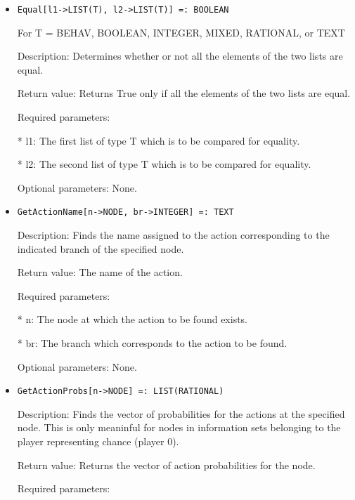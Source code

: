 \begin{itemize}
\item
\begin{verbatim}
Equal[l1->LIST(T), l2->LIST(T)] =: BOOLEAN
\end{verbatim}

	For T = BEHAV, BOOLEAN, INTEGER, MIXED, RATIONAL, or TEXT

\bd
\item
[Description:] Determines whether or not all the elements of the two
lists are equal.
\item
[Return value:] Returns True only if all the elements of the two lists
are equal.
\item
[Required parameters:]\hfil\null 
	
\bd
\item
[* l1:] The first list of type T which is to be compared for equality.
\item
[* l2:] The second list of type T which is to be compared for 
equality.
\ed

\item
[Optional parameters:] None.

\ed

\item
\begin{verbatim}
GetActionName[n->NODE, br->INTEGER] =: TEXT
\end{verbatim}

\bd
\item
[Description:] Finds the name assigned to the action corresponding to 
the indicated branch of the specified node.
\item   
[Return value:] The name of the action.
\item
[Required parameters:]\hfil\null
	
\bd
\item
[* n:] The node at which the action to be found exists.
\item
[* br:] The branch which corresponds to the action to be found.
\ed

\item
[Optional parameters:] None.
\ed

\item
\begin{verbatim}
GetActionProbs[n->NODE] =: LIST(RATIONAL)
\end{verbatim}

\bd
\item
[Description:] Finds the vector of probabilities for the actions at the
specified node.  This is only meaninful for nodes in information sets 
belonging to the player representing chance (player 0).
\item
[Return value:] Returns the vector of action probabilities for the node.
\item
[Required parameters:]\hfil\null
	

\end{itemize}
